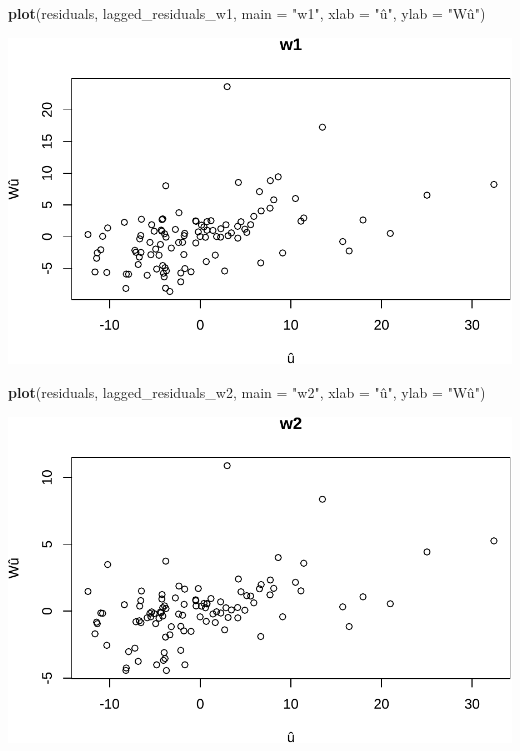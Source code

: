 \documentclass[
  a4paper,
]{article}
\newenvironment{Shaded}{\begin{snugshade}}{\end{snugshade}}
\newcommand{\AttributeTok}[1]{\textcolor[rgb]{0.13,0.29,0.53}{#1}}
\newcommand{\FunctionTok}[1]{\textcolor[rgb]{0.13,0.29,0.53}{\textbf{#1}}}
\newcommand{\NormalTok}[1]{#1}
\newcommand{\StringTok}[1]{\textcolor[rgb]{0.31,0.60,0.02}{#1}}
\begin{document}
\begin{Shaded}
\begin{Highlighting}[]
\FunctionTok{plot}\NormalTok{(residuals, lagged\_residuals\_w1, }\AttributeTok{main =} \StringTok{"w1"}\NormalTok{, }\AttributeTok{xlab =} \StringTok{"û"}\NormalTok{, }\AttributeTok{ylab =} \StringTok{"Wû"}\NormalTok{)}
\end{Highlighting}
\end{Shaded}

\includegraphics{assignment2_files/figure-latex/unnamed-chunk-14-1.pdf}

\begin{Shaded}
\begin{Highlighting}[]
\FunctionTok{plot}\NormalTok{(residuals, lagged\_residuals\_w2, }\AttributeTok{main =} \StringTok{"w2"}\NormalTok{, }\AttributeTok{xlab =} \StringTok{"û"}\NormalTok{, }\AttributeTok{ylab =} \StringTok{"Wû"}\NormalTok{)}
\end{Highlighting}
\end{Shaded}

\includegraphics{assignment2_files/figure-latex/unnamed-chunk-14-2.pdf}
\end{document}
